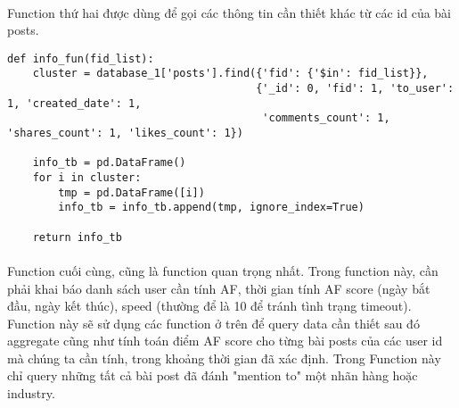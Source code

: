 \documentclass[12pt]{article}
\numberwithin{equation}{section}
\begin{document}
\paragraph{} Function thứ hai được dùng để gọi các thông tin cần thiết khác từ các id của bài posts.
\\

\begin{lstlisting}
def info_fun(fid_list):
    cluster = database_1['posts'].find({'fid': {'$in': fid_list}},
                                       {'_id': 0, 'fid': 1, 'to_user': 1, 'created_date': 1,
                                        'comments_count': 1, 'shares_count': 1, 'likes_count': 1})

    info_tb = pd.DataFrame()
    for i in cluster:
        tmp = pd.DataFrame([i])
        info_tb = info_tb.append(tmp, ignore_index=True)

    return info_tb
\end{lstlisting}

\paragraph{} Function cuối cùng, cũng là function quan trọng nhất. Trong function này, cần phải khai báo danh sách user cần tính AF, thời gian tính AF score (ngày bắt đầu, ngày kết thúc), speed (thường để là 10 để tránh tình trạng timeout). Function này sẽ sử dụng các function ở trên để query data cần thiết sau đó aggregate cũng như tính toán điểm AF score cho từng bài posts của các user id mà chúng ta cần tính, trong khoảng thời gian đã xác định. Trong Function này chỉ query những tất cả bài post đã đánh "mention to" một nhãn hàng hoặc industry.
\end{document}
